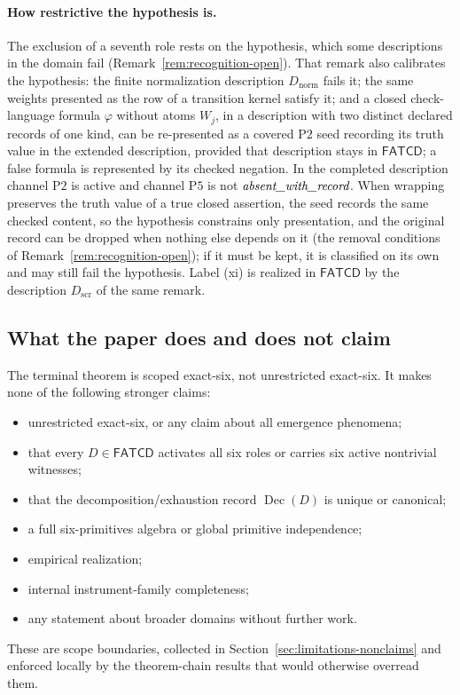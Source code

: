 \documentclass[11pt]{article}
\theoremstyle{definition}
\newcommand{\FATCD}{\ensuremath{\mathsf{FATCD}}}
\newcommand{\Dec}[1]{\ensuremath{\operatorname{Dec}\!\left(#1\right)}}
\newcommand{\absentrec}{\textit{absent\_\allowbreak with\_\allowbreak record}}
\newcommand{\Ptwo}{\ensuremath{\mathrm{P2}}}
\newcommand{\Pfive}{\ensuremath{\mathrm{P5}}}
\begin{document}
\paragraph{How restrictive the hypothesis is.} The exclusion of a seventh role rests
on the hypothesis, which some descriptions in the domain fail
(Remark~\ref{rem:recognition-open}). That remark also calibrates the
hypothesis: the finite normalization description \(D_{\mathrm{norm}}\) fails it;
the same weights presented as the row of a transition kernel satisfy it; and a closed check-language formula \(\varphi\) without atoms \(W_j\), in a description with two distinct declared records of one kind, can be re-presented as a covered \Ptwo{} seed recording its truth value in the extended description, provided that description stays in \FATCD{}; a false formula is represented by its checked negation. In the completed description channel \Ptwo{} is active and channel \Pfive{} is not \(\absentrec\). When wrapping preserves the truth value of a true closed assertion, the seed records the same checked content, so the hypothesis constrains only presentation, and the
original record can be dropped when nothing else depends on it (the removal
conditions of Remark~\ref{rem:recognition-open}); if it must be kept, it is
classified on its own and may still fail the hypothesis. Label (xi) is realized in \FATCD{} by the
description \(D_{\mathrm{scr}}\) of the same remark.

\subsection{What the paper does and does not claim}\label{subsec:intro-nonclaims}

The terminal theorem is scoped exact-six, not unrestricted exact-six.
It makes none of the following stronger claims:
\begin{itemize}[topsep=2pt,itemsep=1pt]
  \item unrestricted exact-six, or any claim about all emergence
    phenomena;
  \item that every \(D \in \FATCD{}\) activates all six roles or
    carries six active nontrivial witnesses;
  \item that the decomposition/exhaustion record \(\Dec{D}\) is unique
    or canonical;
  \item a full six-primitives algebra or global primitive
    independence;
  \item empirical realization;
  \item internal instrument-family completeness;
  \item any statement about broader domains without further work.
\end{itemize}
These are scope boundaries, collected in
Section~\ref{sec:limitations-nonclaims} and enforced locally by the
theorem-chain results that would otherwise overread them.
\end{document}
